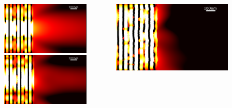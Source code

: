 \documentclass{beamer}
\begin{document}
\begin{frame}[t]
	\begin{columns}
		\begin{column}{0.5\textwidth}
			\begin{figure}[htb]
				\includegraphics[width=\textwidth]{../images/multilayer/oer-rms0.png}\\
				\includegraphics[width=\textwidth]{../images/multilayer/oer-rms01.png}\\
			\end{figure}
		\end{column}
		\begin{column}{0.5\textwidth}
				\includegraphics[width=\textwidth]{../images/multilayer/oer-rms05.png}\\

\end{column}
\end{columns}
\end{frame}
\end{document}
